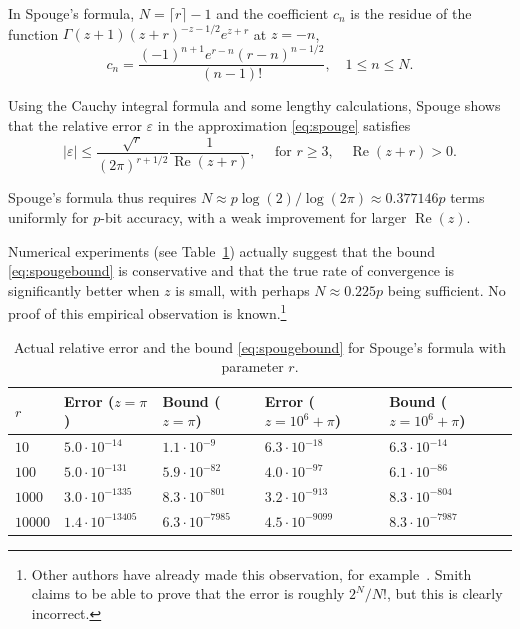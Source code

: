 \documentclass[reqno]{amsart}
\newcommand{\Real}{\operatorname{Re}}
\theoremstyle{definition}
\begin{document}
In Spouge's formula, $N = \lceil r \rceil - 1$ and
the coefficient $c_n$ is
the residue of the function $\Gamma(z+1) (z+r)^{-z-1/2} e^{z+r}$ at $z = -n$,
\begin{equation}
c_n = \frac{(-1)^{n+1} e^{r-n} (r-n)^{n-1/2}}{(n-1)!}, \quad 1 \le n \le N.
\end{equation}

Using the Cauchy integral formula and some lengthy calculations,
Spouge shows that the relative error $\varepsilon$ in the approximation \eqref{eq:spouge} satisfies~\cite[Theorem~1.3.1]{Spouge1994}
\begin{equation}
|\varepsilon| \le \frac{\sqrt{r}}{(2\pi)^{r+1/2}} \frac{1}{\Real(z+r)}, \quad \text{ for } r \ge 3, \quad \Real(z+r) > 0.
\label{eq:spougebound}
\end{equation}

Spouge's formula thus requires $N \approx p \log(2) / \log(2 \pi) \approx 0.377146 p$ terms
uniformly for $p$-bit accuracy,
with a weak improvement for larger $\Real(z)$.

Numerical experiments (see Table~\ref{tab:spougetab}) actually suggest that the
bound \eqref{eq:spougebound} is
conservative and that the true rate of convergence is
significantly better when $z$ is small,
with perhaps $N \approx 0.225 p$ being sufficient.
No proof of this empirical observation is known.\footnote{Other authors have already made this observation, for example~\cite{schmelzer2007computing}. Smith~\cite{smith2006gamma} claims to be able to prove that the error is roughly $2^N / N!$, but this is clearly incorrect.}

\begin{table}
\setlength{\tabcolsep}{3pt}
\renewcommand{\arraystretch}{1.1}
\centering
\caption{Actual relative error and the bound \eqref{eq:spougebound} for Spouge's formula with parameter $r$.}
\label{tab:spougetab}
\small
\begin{tabular}{l l l l l}
 $r$ & Error ($z = \pi$) & Bound ($z = \pi$) & Error ($z = 10^6+\pi$) & Bound ($z = 10^6+\pi$) \\ %
 \hline
 $10$ &  $5.0 \cdot 10^{-14}$ & $1.1 \cdot 10^{-9}$  & $6.3 \cdot 10^{-18}$ & $6.3 \cdot 10^{-14}$ \\
 $100$ &  $5.0 \cdot 10^{-131}$ & $5.9 \cdot 10^{-82}$  & $4.0 \cdot 10^{-97}$ & $6.1 \cdot 10^{-86}$ \\
 $1000$ &  $3.0 \cdot 10^{-1335}$ & $8.3 \cdot 10^{-801}$  & $3.2 \cdot 10^{-913}$ & $8.3 \cdot 10^{-804}$ \\
 $10000$ &  $1.4 \cdot 10^{-13405}$ & $6.3 \cdot 10^{-7985}$  & $4.5 \cdot 10^{-9099}$ & $8.3 \cdot 10^{-7987}$ \\
\end{tabular}
\end{table}
\end{document}

